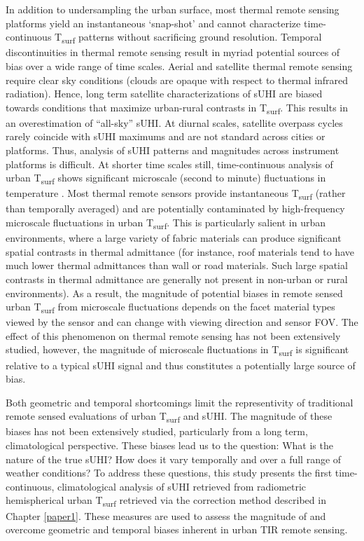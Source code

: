 \begin{bibunit}
In addition to undersampling the urban surface, most thermal remote sensing platforms yield an instantaneous ‘snap-shot’ and cannot characterize time-continuous T\textsubscript{surf} patterns without sacrificing ground resolution. Temporal discontinuities in thermal remote sensing result in myriad potential sources of bias over a wide range of time scales. Aerial and satellite thermal remote sensing require clear sky conditions (clouds are opaque with respect to thermal infrared radiation). Hence, long term satellite characterizations of sUHI are biased towards conditions that maximize urban-rural contrasts in T\textsubscript{surf}. This results in an overestimation of “all-sky” sUHI. At diurnal scales, satellite overpass cycles rarely coincide with sUHI maximums and are not standard across cities or platforms. Thus, analysis of sUHI patterns and magnitudes across instrument platforms is difficult. At shorter time scales still, time-continuous analysis of urban T\textsubscript{surf} shows significant microscale (second to minute) fluctuations in temperature \citep{Christen2012}. Most thermal remote sensors provide instantaneous T\textsubscript{surf} (rather than temporally averaged) and are potentially contaminated by high-frequency microscale fluctuations in urban T\textsubscript{surf}. This is particularly salient in urban environments, where a large variety of fabric materials can produce significant spatial contrasts in thermal admittance (for instance, roof materials tend to have much lower thermal admittances than wall or road materials. Such large spatial contrasts in thermal admittance are generally not present in non-urban or rural environments). As a result, the magnitude of potential biases in remote sensed urban T\textsubscript{surf} from microscale fluctuations depends on the facet material types viewed by the sensor and can change with viewing direction and sensor FOV. The effect of this phenomenon on thermal remote sensing has not been extensively studied, however, the magnitude of microscale fluctuations in T\textsubscript{surf} is significant relative to a typical sUHI signal and thus constitutes a potentially large source of bias.

Both geometric and temporal shortcomings limit the representivity of traditional remote sensed evaluations of urban T\textsubscript{surf} and sUHI. The magnitude of these biases has not been extensively studied, particularly from a long term, climatological perspective. These biases lead us to the question: What is the nature of the true sUHI? How does it vary temporally and over a full range of weather conditions? To address these questions, this study presents the first time-continuous, climatological analysis of sUHI retrieved from radiometric hemispherical urban T\textsubscript{surf} retrieved via the correction method described in Chapter \ref{paper1}. These measures are used to assess the magnitude of and overcome geometric and temporal biases inherent in urban TIR remote sensing.


\end{bibunit}
